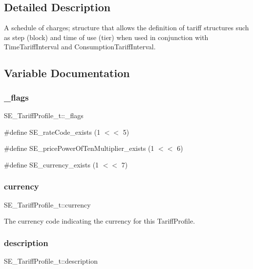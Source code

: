 \subsection{Detailed Description}
A schedule of charges; structure that allows the definition of tariff structures such as step (block) and time of use (tier) when used in conjunction with Time\+Tariff\+Interval and Consumption\+Tariff\+Interval. 

\subsection{Variable Documentation}
\mbox{\label{group__TariffProfile_gaa78d09e0c7107d9a1f284ae5704cf953}} 
\subsubsection{\texorpdfstring{\+\_\+flags}{\_flags}}
{\footnotesize\ttfamily S\+E\+\_\+\+Tariff\+Profile\+\_\+t\+::\+\_\+flags}

\#define S\+E\+\_\+rate\+Code\+\_\+exists (1 $<$$<$ 5)

\#define S\+E\+\_\+price\+Power\+Of\+Ten\+Multiplier\+\_\+exists (1 $<$$<$ 6)

\#define S\+E\+\_\+currency\+\_\+exists (1 $<$$<$ 7) \mbox{\label{group__TariffProfile_ga30b65778dba600d5614a0ef2426a5cf8}} 
\subsubsection{\texorpdfstring{currency}{currency}}
{\footnotesize\ttfamily S\+E\+\_\+\+Tariff\+Profile\+\_\+t\+::currency}

The currency code indicating the currency for this Tariff\+Profile. \mbox{\label{group__TariffProfile_gaaad6cdc4afe4bfa613d5a1b234ea195b}} 
\subsubsection{\texorpdfstring{description}{description}}
{\footnotesize\ttfamily S\+E\+\_\+\+Tariff\+Profile\+\_\+t\+::description}

